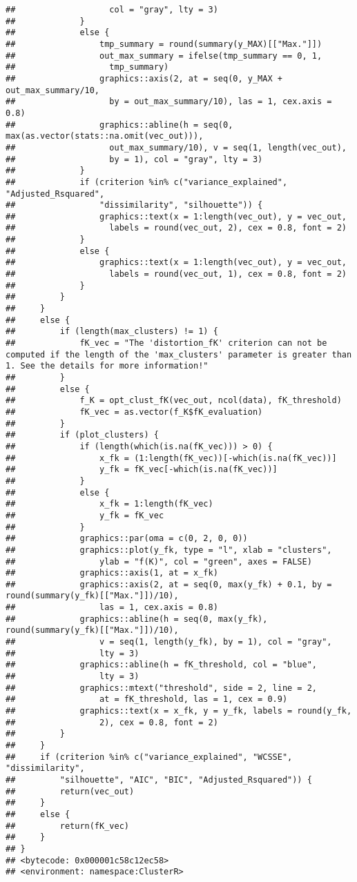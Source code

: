 \documentclass[
]{article}
\begin{document}
\begin{verbatim}
##                   col = "gray", lty = 3)
##             }
##             else {
##                 tmp_summary = round(summary(y_MAX)[["Max."]])
##                 out_max_summary = ifelse(tmp_summary == 0, 1, 
##                   tmp_summary)
##                 graphics::axis(2, at = seq(0, y_MAX + out_max_summary/10, 
##                   by = out_max_summary/10), las = 1, cex.axis = 0.8)
##                 graphics::abline(h = seq(0, max(as.vector(stats::na.omit(vec_out))), 
##                   out_max_summary/10), v = seq(1, length(vec_out), 
##                   by = 1), col = "gray", lty = 3)
##             }
##             if (criterion %in% c("variance_explained", "Adjusted_Rsquared", 
##                 "dissimilarity", "silhouette")) {
##                 graphics::text(x = 1:length(vec_out), y = vec_out, 
##                   labels = round(vec_out, 2), cex = 0.8, font = 2)
##             }
##             else {
##                 graphics::text(x = 1:length(vec_out), y = vec_out, 
##                   labels = round(vec_out, 1), cex = 0.8, font = 2)
##             }
##         }
##     }
##     else {
##         if (length(max_clusters) != 1) {
##             fK_vec = "The 'distortion_fK' criterion can not be computed if the length of the 'max_clusters' parameter is greater than 1. See the details for more information!"
##         }
##         else {
##             f_K = opt_clust_fK(vec_out, ncol(data), fK_threshold)
##             fK_vec = as.vector(f_K$fK_evaluation)
##         }
##         if (plot_clusters) {
##             if (length(which(is.na(fK_vec))) > 0) {
##                 x_fk = (1:length(fK_vec))[-which(is.na(fK_vec))]
##                 y_fk = fK_vec[-which(is.na(fK_vec))]
##             }
##             else {
##                 x_fk = 1:length(fK_vec)
##                 y_fk = fK_vec
##             }
##             graphics::par(oma = c(0, 2, 0, 0))
##             graphics::plot(y_fk, type = "l", xlab = "clusters", 
##                 ylab = "f(K)", col = "green", axes = FALSE)
##             graphics::axis(1, at = x_fk)
##             graphics::axis(2, at = seq(0, max(y_fk) + 0.1, by = round(summary(y_fk)[["Max."]])/10), 
##                 las = 1, cex.axis = 0.8)
##             graphics::abline(h = seq(0, max(y_fk), round(summary(y_fk)[["Max."]])/10), 
##                 v = seq(1, length(y_fk), by = 1), col = "gray", 
##                 lty = 3)
##             graphics::abline(h = fK_threshold, col = "blue", 
##                 lty = 3)
##             graphics::mtext("threshold", side = 2, line = 2, 
##                 at = fK_threshold, las = 1, cex = 0.9)
##             graphics::text(x = x_fk, y = y_fk, labels = round(y_fk, 
##                 2), cex = 0.8, font = 2)
##         }
##     }
##     if (criterion %in% c("variance_explained", "WCSSE", "dissimilarity", 
##         "silhouette", "AIC", "BIC", "Adjusted_Rsquared")) {
##         return(vec_out)
##     }
##     else {
##         return(fK_vec)
##     }
## }
## <bytecode: 0x000001c58c12ec58>
## <environment: namespace:ClusterR>
\end{verbatim}
\end{document}
